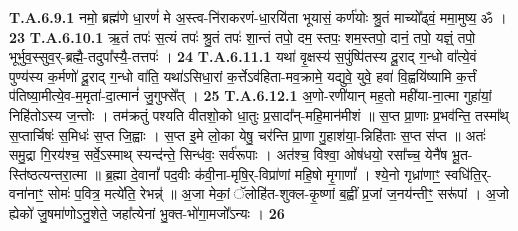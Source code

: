 \documentclass[17pt]{extarticle}
\begin{document}
                  \newline
                                                         \textbf{} \newline \newline
                                \textbf{ T.A.6.9.1} \newline
                  नमो॒ ब्रह्म॑णे धा॒रणं॑ मे अ॒स्त्व-नि॑राकरणं-धा॒रयि॑ता भूयासं॒ कर्ण॑योः श्रु॒तं माच्यो᳚ढ्वं॒ ममा॒मुष्य॒ ॐ । \textbf{ 23} \newline
                  \newline
                                                         \textbf{} \newline \newline
                                \textbf{ T.A.6.10.1} \newline
                  ऋ॒तं तपः॑ स॒त्यं तपः॑ श्रु॒तं तपः॑ शा॒न्तं तपो॒ दम॒ स्तपः॒ शम॒स्तपो॒ दानं॒ तपो॒ यज्ञ्ं॒ तपो॒ भूर्भुव॒स्सुव॒र्-ब्रह्मै॒-तदुपा᳚स्यै॒-तत्तपः॑ । \textbf{ 24} \newline
                  \newline
                                                         \textbf{} \newline \newline
                                \textbf{ T.A.6.11.1} \newline
                  यथा॑ वृ॒क्षस्य॑ स॒पुंष्पि॑तस्य दू॒राद् ग॒न्धो वा᳚त्ये॒वं पुण्य॑स्य क॒र्मणो॑ दू॒राद् ग॒न्धो वा॑ति॒ यथा॑ऽसिधा॒रां क॒र्त्तेऽव॑हिता-मव॒क्रामे॒ यद्युवे॒ युवे॒ हवा॑ वि॒ह्वयि॑ष्यामि क॒र्त्तं प॑तिष्या॒मीत्ये॒व-म॒मृता॑-दा॒त्मानं॑ जु॒गुफ्से᳚त् । \textbf{ 25} \newline
                  \newline
                                                         \textbf{} \newline \newline
                                \textbf{ T.A.6.12.1} \newline
                  अ॒णो-रणी॑यान् मह॒तो मही॑या-ना॒त्मा गुहा॑यां॒ निहि॑तोऽस्य ज॒न्तोः । तम॑क्रतुं पश्यति वीतशो॒को धा॒तुः प्र॒सादा᳚न्-महि॒मान॑मीशं ॥  स॒प्त प्रा॒णाः प्र॒भव॑न्ति॒ तस्मा᳚थ् स॒प्तार्चिषः॑ स॒मिधः॑ स॒प्त जि॒ह्वाः । स॒प्त इ॒मे लो॒का येषु॒ चर॑न्ति प्रा॒णा गु॒हाश॑या॒-न्निहि॑ताः स॒प्त स॑प्त ॥  अतः॑ समु॒द्रा गि॒रय॑श्च॒ सर्वे॒ऽस्माथ् स्यन्द॑न्ते॒ सिन्ध॑वः॒ सर्व॑रूपाः । अत॑श्च॒ विश्वा॒ ओष॑धयो॒ रसा᳚च्च॒ येनै॑ष भू॒त-स्ति॑ष्ठत्यन्तरा॒त्मा ॥  ब्र॒ह्मा दे॒वानां᳚ पद॒वीः क॑वी॒ना-मृषि॒र्-विप्रा॑णां महि॒षो मृ॒गाणां᳚ ।  श्ये॒नो गृध्रा॑णाꣳ॒॒ स्वधि॑ति॒र्-वना॑नाꣳ॒॒ सोमः॑ प॒वित्र॒ मत्ये॑ति॒ रेभन्न्॑ ॥  अ॒जा मेकां॒ ॅलोहि॑त-शुक्ल-कृ॒ष्णां ब॒ह्वीं प्र॒जां ज॒नय॑न्तीꣳ॒॒ सरू॑पां । अ॒जो ह्येको॑ जु॒षमा॑णोऽनु॒शेते॒ जहा᳚त्येनां भु॒क्त-भो॑गा॒मजो᳚ऽन्यः । \textbf{ 26} \newline
\end{document}
